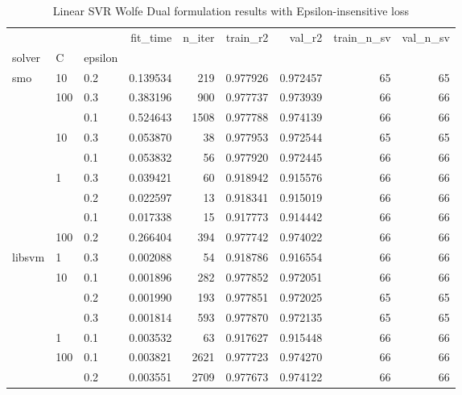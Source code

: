 \begin{table}[H]
\centering
\caption{Linear SVR Wolfe Dual formulation results with Epsilon-insensitive loss}
\label{linear_dual_svr_cv_results}
\begin{tabular}{lllrrrrrr}
\toprule
       &     &     &  fit\_time &  n\_iter &  train\_r2 &    val\_r2 &  train\_n\_sv &  val\_n\_sv \\
solver & C & epsilon &           &         &           &           &             &           \\
\midrule
smo & 10  & 0.2 &  0.139534 &     219 &  0.977926 &  0.972457 &          65 &        65 \\
       & 100 & 0.3 &  0.383196 &     900 &  0.977737 &  0.973939 &          66 &        66 \\
       &     & 0.1 &  0.524643 &    1508 &  0.977788 &  0.974139 &          66 &        66 \\
       & 10  & 0.3 &  0.053870 &      38 &  0.977953 &  0.972544 &          65 &        65 \\
       &     & 0.1 &  0.053832 &      56 &  0.977920 &  0.972445 &          66 &        66 \\
       & 1   & 0.3 &  0.039421 &      60 &  0.918942 &  0.915576 &          66 &        66 \\
       &     & 0.2 &  0.022597 &      13 &  0.918341 &  0.915019 &          66 &        66 \\
       &     & 0.1 &  0.017338 &      15 &  0.917773 &  0.914442 &          66 &        66 \\
       & 100 & 0.2 &  0.266404 &     394 &  0.977742 &  0.974022 &          66 &        66 \\
libsvm & 1   & 0.3 &  0.002088 &      54 &  0.918786 &  0.916554 &          66 &        66 \\
       & 10  & 0.1 &  0.001896 &     282 &  0.977852 &  0.972051 &          66 &        66 \\
       &     & 0.2 &  0.001990 &     193 &  0.977851 &  0.972025 &          65 &        65 \\
       &     & 0.3 &  0.001814 &     593 &  0.977870 &  0.972135 &          65 &        65 \\
       & 1   & 0.1 &  0.003532 &      63 &  0.917627 &  0.915448 &          66 &        66 \\
       & 100 & 0.1 &  0.003821 &    2621 &  0.977723 &  0.974270 &          66 &        66 \\
       &     & 0.2 &  0.003551 &    2709 &  0.977673 &  0.974122 &          66 &        66 \\

\end{tabular}
\end{table}
